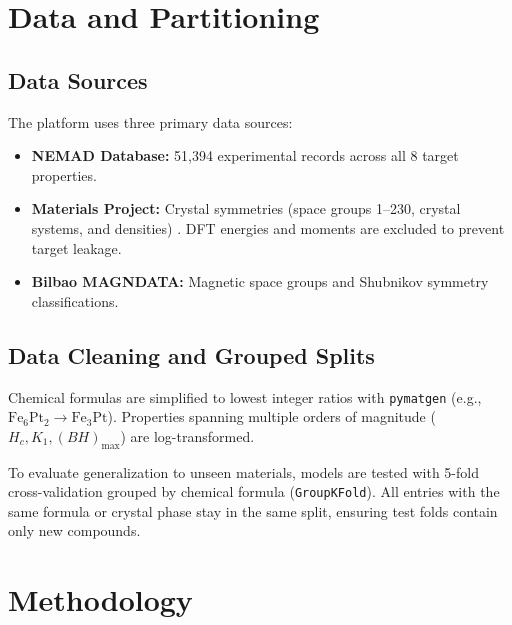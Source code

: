 \documentclass[11pt,a4paper]{article}
\begin{document}
\clearpage

\section{Data and Partitioning}

\subsection{Data Sources}
\label{sec:data_sources}
The platform uses three primary data sources:
\begin{itemize}[leftmargin=1.5em]
    \item \textbf{NEMAD Database:} 51,394 experimental records \cite{nemad2025} across all 8 target properties.
    \item \textbf{Materials Project:} Crystal symmetries (space groups 1--230, crystal systems, and densities) \cite{materials_project}. DFT energies and moments are excluded to prevent target leakage.
    \item \textbf{Bilbao MAGNDATA:} Magnetic space groups and Shubnikov symmetry classifications.
\end{itemize}

\subsection{Data Cleaning and Grouped Splits}
\label{sec:data_splits}
Chemical formulas are simplified to lowest integer ratios with \texttt{pymatgen} (e.g., $\text{Fe}_6\text{Pt}_2 \to \text{Fe}_3\text{Pt}$). Properties spanning multiple orders of magnitude ($H_c, K_1, (BH)_{\max}$) are log-transformed.

To evaluate generalization to unseen materials, models are tested with 5-fold cross-validation grouped by chemical formula (\texttt{GroupKFold}). All entries with the same formula or crystal phase stay in the same split, ensuring test folds contain only new compounds.

\clearpage
\section{Methodology}
\end{document}
